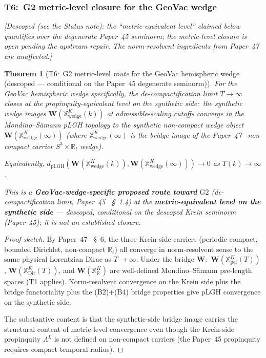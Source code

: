 \documentclass[11pt,a4paper]{article}
\theoremstyle{plain}
\newtheorem{theorem}{Theorem}[section]
\theoremstyle{definition}
\newcommand{\sthree}{S^{3}}
\newcommand{\R}{\mathbb{R}}
\newcommand{\Lprop}{\Lambda^{L}}
\newcommand{\Wfun}{\mathbf{W}}
\begin{document}
\subsubsection{T6:\ G2 metric-level closure for the GeoVac
wedge}\label{sec:t6_g2_wedge_closure}

\emph{[Descoped (see the Status note): the ``metric-equivalent
level'' claimed below quantifies over the degenerate Paper~45
seminorm; the metric-level closure is open pending the upstream
repair. The norm-resolvent ingredients from Paper~47 are
unaffected.]}

\begin{theorem}[T6:\ G2 metric-level \emph{route} for the GeoVac
hemispheric wedge (descoped --- conditional on the Paper~45 degenerate seminorm)]\label{thm:g2_wedge_closure}
For the GeoVac hemispheric wedge specifically, the de-compactification
limit $T \to \infty$ closes at the \emph{propinquity-equivalent
level on the synthetic side}:\ the synthetic wedge images
$\Wfun(\mathbb{X}^{K}_{\mathrm{wedge}}(k))$ at admissible-scaling
cutoffs converge in the Mondino--S\"amann pLGH topology to the
synthetic non-compact wedge object $\Wfun(\mathbb{X}^{K}_{\mathrm{wedge}}(\infty))$
(where $\mathbb{X}^{K}_{\mathrm{wedge}}(\infty)$ is the bridge image
of the Paper~47~\cite{paper47} non-compact carrier $\sthree\times\R_{t}$
wedge).

Equivalently, $d_{\mathrm{pLGH}}(\Wfun(\mathbb{X}^{K}_{\mathrm{wedge}}(k)),
\Wfun(\mathbb{X}^{K}_{\mathrm{wedge}}(\infty))) \to 0$ as $T(k) \to \infty$.

This is a \textbf{GeoVac-wedge-specific proposed route toward} $\mathrm{G2}$
(de-compactification limit, Paper~45~\cite{paper45} \S~1.4) at the
\textbf{metric-equivalent level on the synthetic side} --- \emph{descoped},
conditional on the descoped Krein seminorm (Paper~45); it is not an
established closure.
\end{theorem}

\begin{proof}[Proof sketch]
By Paper~47~\cite{paper47} \S~6, the three Krein-side carriers
(periodic compact, bounded Dirichlet, non-compact $\R_{t}$) all
converge in norm-resolvent sense to the same physical Lorentzian
Dirac as $T \to \infty$. Under the bridge $\Wfun$:\
$\Wfun(\mathbb{X}^{K}_{\mathrm{per}}(T))$,
$\Wfun(\mathbb{X}^{K}_{\mathrm{Dir}}(T))$, and
$\Wfun(\mathbb{X}^{K}_{\R})$ are well-defined Mondino--S\"amann
pre-length spaces (T1 applies). Norm-resolvent convergence on the
Krein side plus the bridge functoriality plus the (B2)+(B4) bridge
properties give pLGH convergence on the synthetic side.

The substantive content is that the synthetic-side bridge image
carries the structural content of metric-level convergence even
though the Krein-side propinquity $\Lprop$ is not defined on
non-compact carriers (the Paper~45 propinquity requires compact
temporal radius).
\end{proof}
\end{document}
